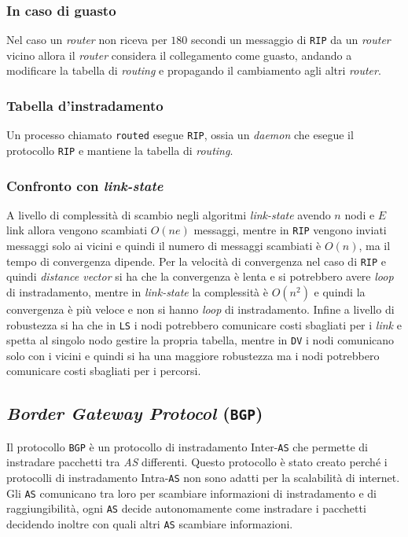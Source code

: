         \subsubsection{In caso di guasto}
            Nel caso un \textit{router} non riceva per $180$ secondi un messaggio di \texttt{RIP} da un \textit{router} vicino allora il \textit{router} considera il collegamento come guasto, andando a modificare la tabella di \textit{routing} e propagando il cambiamento agli altri \textit{router}.
        \subsubsection{Tabella d'instradamento}
            Un processo chiamato \texttt{routed} esegue \texttt{RIP}, ossia un \textit{daemon} che esegue il protocollo \texttt{RIP} e mantiene la tabella di \textit{routing}. 
        \subsubsection{Confronto con \textit{link-state}}
            A livello di complessità di scambio negli algoritmi \textit{link-state} avendo $n$ nodi e $E$ link allora vengono scambiati $O(ne)$ messaggi, mentre in \texttt{RIP} vengono inviati messaggi solo ai vicini e quindi il numero di messaggi scambiati è $O(n)$, ma il tempo di convergenza dipende.\newline
            Per la velocità di convergenza nel caso di \texttt{RIP} e quindi \textit{distance vector} si ha che la convergenza è lenta e si potrebbero avere \textit{loop} di instradamento, mentre in \textit{link-state} la complessità è $O(n^2)$ e quindi la convergenza è più veloce e non si hanno \textit{loop} di instradamento.\newline
            Infine a livello di robustezza si ha che in \texttt{LS} i nodi potrebbero comunicare costi sbagliati per i \textit{link} e spetta al singolo nodo gestire la propria tabella, mentre in \texttt{DV} i nodi comunicano solo con i vicini e quindi si ha una maggiore robustezza ma i nodi potrebbero comunicare costi sbagliati per i percorsi.
    \subsection{\textit{Border Gateway Protocol} (\texttt{BGP})}
        Il protocollo \texttt{BGP} è un protocollo di instradamento Inter-\texttt{AS} che permette di instradare pacchetti tra \textit{AS} differenti. Questo protocollo è stato creato perché i protocolli di instradamento Intra-\texttt{AS} non sono adatti per la scalabilità di internet. Gli \texttt{AS} comunicano tra loro per scambiare informazioni di instradamento e di raggiungibilità, ogni \texttt{AS} decide autonomamente come instradare i pacchetti decidendo inoltre con quali altri \texttt{AS} scambiare informazioni.
